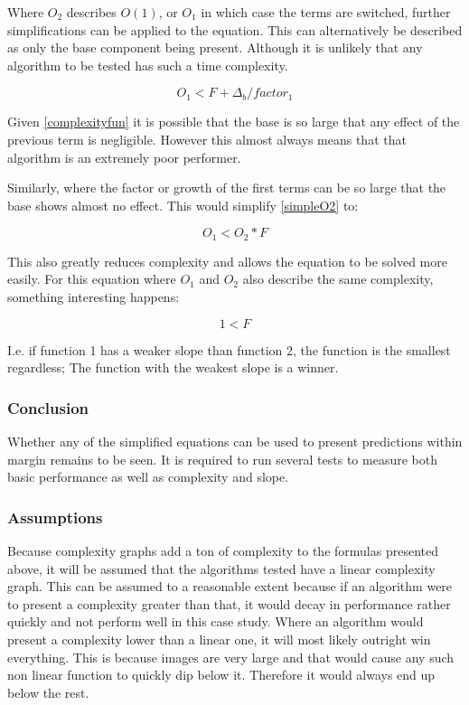 \documentclass[11pt,a4paper]{report}
\begin{document}
Where $O_2$ describes $O(1)$, or $O_1$ in which case the terms are switched, further simplifications can be applied to the equation. This can alternatively be described as only the base component being present. Although it is unlikely that any algorithm to be tested has such a time complexity.

\begin{equation}
O_1 < F + \Delta_b / factor_1
\end{equation}

Given \ref{complexityfun} it is possible that the base is so large that any effect of the previous term is negligible. However this almost always means that that algorithm is an extremely poor performer.

Similarly, where the factor or growth of the first terms can be so large that the base shows almost no effect. This would simplify \ref{simpleO2} to:

\begin{equation}
O_1 < O_2 * F
\end{equation}

This also greatly reduces complexity and allows the equation to be solved more easily. For this equation where $O_1$ and $O_2$ also describe the same complexity, something interesting happens:

\begin{equation}
1 < F
\end{equation}

I.e. if function 1 has a weaker slope than function 2, the function is the smallest regardless; The function with the weakest slope is a winner.

\subsubsection{Conclusion}

Whether any of the simplified equations can be used to present predictions within margin remains to be seen. It is required to run several tests to measure both basic performance as well as complexity and slope.

\subsubsection{Assumptions\label{complexityasumption}}

Because complexity graphs add a ton of complexity to the formulas presented above, it will be assumed that the algorithms tested have a linear complexity graph. This can be assumed to a reasonable extent because if an algorithm were to present a complexity greater than that, it would decay in performance rather quickly and not perform well in this case study. Where an algorithm would present a complexity lower than a linear one, it will most likely outright win everything. This is because images are very large and that would cause any such non linear function to quickly dip below it. Therefore it would always end up below the rest.
\end{document}
